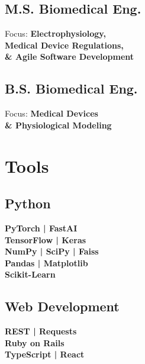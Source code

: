 \documentclass[letterpaper]{deedy-resume} %
\begin{document}
\begin{minipage}[t]{0.33\textwidth}
\subsection{M.S. Biomedical Eng.}
Focus: \bf Electrophysiology, \\ 
Medical Device Regulations, \\ 
\& Agile Software Development \\

\sectionspace %

\subsection{B.S. Biomedical Eng.}
Focus: \bf Medical Devices \\
\& Physiological Modeling \\

\sectionspace %


\section{Tools}

\subsection{Python}
{\bf PyTorch | FastAI} \\
{\bf TensorFlow | Keras} \\
{\bf NumPy | SciPy | Faiss} \\
{\bf Pandas | Matplotlib} \\
{\bf Scikit-Learn} \\

\sectionspace

\subsection{Web Development}
{\bf REST | Requests} \\
{\bf Ruby on Rails} \\
{\bf TypeScript | React} \\

\sectionspace %


\end{minipage}
\end{document}
